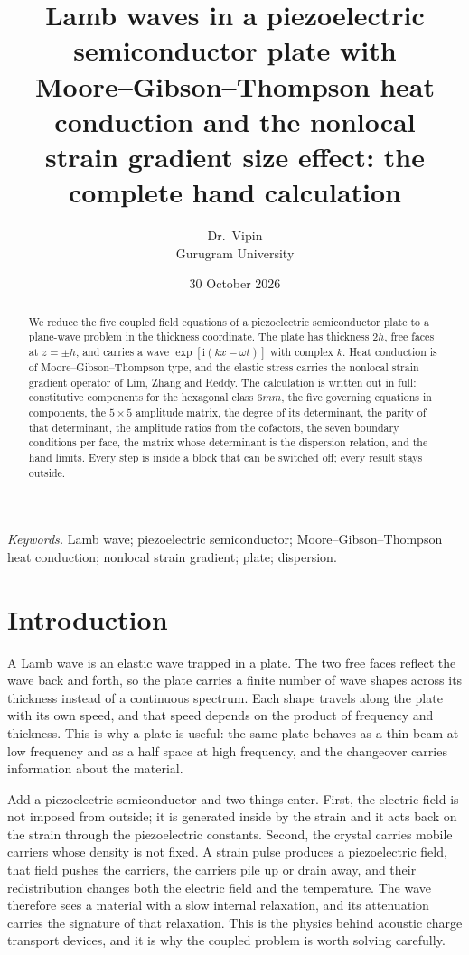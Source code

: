 \documentclass[11pt,a4paper]{article}
\title{\bfseries Lamb waves in a piezoelectric semiconductor plate with\\[2pt]
Moore--Gibson--Thompson heat conduction and the nonlocal\\[2pt]
strain gradient size effect: the complete hand calculation}
\author{Dr.\ Vipin\\ Gurugram University}
\date{30 October 2026}
\newcommand{\ii}{\mathrm{i}}
\begin{document}
\maketitle

\begin{abstract}
\noindent
We reduce the five coupled field equations of a piezoelectric semiconductor plate to a plane-wave problem
in the thickness coordinate. The plate has thickness $2h$, free faces at $z=\pm h$, and carries a wave
$\exp[\ii(kx-\omega t)]$ with complex $k$. Heat conduction is of Moore--Gibson--Thompson type, and the
elastic stress carries the nonlocal strain gradient operator of Lim, Zhang and Reddy. The calculation is
written out in full: constitutive components for the hexagonal class $6mm$, the five governing equations in
components, the $5\times5$ amplitude matrix, the degree of its determinant, the parity of that determinant,
the amplitude ratios from the cofactors, the seven boundary conditions per face, the matrix whose
determinant is the dispersion relation, and the hand limits. Every step is inside a block that can be
switched off; every result stays outside.
\end{abstract}

\noindent\textit{Keywords.} Lamb wave; piezoelectric semiconductor; Moore--Gibson--Thompson heat conduction;
nonlocal strain gradient; plate; dispersion.

\section{Introduction}

A Lamb wave is an elastic wave trapped in a plate. The two free faces reflect the wave back and forth, so the
plate carries a finite number of wave shapes across its thickness instead of a continuous spectrum. Each
shape travels along the plate with its own speed, and that speed depends on the product of frequency and
thickness. This is why a plate is useful: the same plate behaves as a thin beam at low frequency and as a
half space at high frequency, and the changeover carries information about the material.

Add a piezoelectric semiconductor and two things enter. First, the electric field is not imposed from
outside; it is generated inside by the strain and it acts back on the strain through the piezoelectric
constants. Second, the crystal carries mobile carriers whose density is not fixed. A strain pulse produces a
piezoelectric field, that field pushes the carriers, the carriers pile up or drain away, and their
redistribution changes both the electric field and the temperature. The wave therefore sees a material
with a slow internal relaxation, and its attenuation carries the signature of that relaxation. This is the
physics behind acoustic charge transport devices, and it is why the coupled problem is worth solving
carefully.
\end{document}
